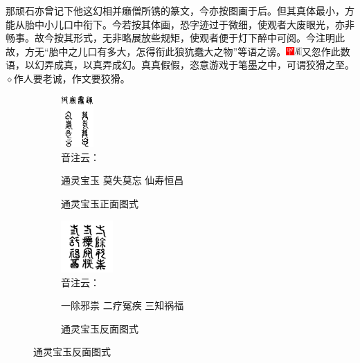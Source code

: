 那顽石亦曾记下他这幻相并癞僧所镌的篆文，今亦按图画于后。但其真体最小，方能从胎中小儿口中衔下。今若按其体画，恐字迹过于微细，使观者大废眼光，亦非畅事。故今按其形式，无非略展放些规矩，使观者便于灯下醉中可阅。今注明此故，方无“胎中之儿口有多大，怎得衔此狼犺蠢大之物”等语之谤。{\includegraphics[width=3mm]{../Images/00002}\includegraphics[width=3mm]{../Images/00010}\footnotesize \kaishu 又忽作此数语，以幻弄成真，以真弄成幻。真真假假，恣意游戏于笔墨之中，可谓狡猾之至。{$\diamond$}作人要老诚，作文要狡猾。}
\begin{figure}[htp]
	\centering
	\begin{subfigure}{12em}
	  \centering
	  \includegraphics[height=20mm]{../images/00018} %
	  \\音注云：\parbox[t]{4em}%
		{通灵宝玉 莫失莫忘 仙寿恒昌}
	  \caption{通灵宝玉正面图式}
	  \label{fig:subfigure-cap1}
	\end{subfigure}
	\qquad
	\begin{subfigure}{12em}
	  \centering
	  \includegraphics[height=20mm]{../images/00019}
	  \\音注云：\parbox[t]{4em}%
	  {一除邪祟 二疗冤疾 三知祸福}
	  \caption{通灵宝玉反面图式}
	  \label{fig:subfigure-cap2}
	\end{subfigure}
	\label{fig:subcaption}
\end{figure}

